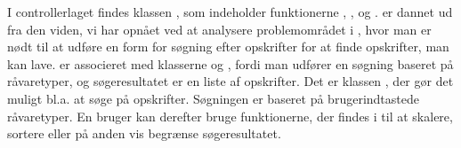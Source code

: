 I controllerlaget findes klassen , som indeholder funktionerne , ,  og .  er dannet ud fra den viden, vi har opnået ved at analysere problemområdet i , hvor man er nødt til at udføre en form for søgning efter opskrifter for at finde opskrifter, man kan lave.  er associeret med klasserne  og , fordi man udfører en søgning baseret på råvaretyper, og søgeresultatet er en liste af opskrifter. Det er klassen , der gør det muligt bl.a. at søge på opskrifter. Søgningen er baseret på brugerindtastede råvaretyper. En bruger kan derefter bruge funktionerne, der findes i  til at skalere, sortere eller på anden vis begrænse søgeresultatet.